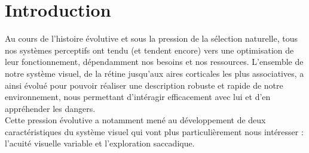 
\chapter{Introduction} %
\label{Introduction} %


\newcommand{\keyword}[1]{\textbf{#1}}
\newcommand{\tabhead}[1]{\textbf{#1}}
\newcommand{\code}[1]{\texttt{#1}}
\newcommand{\file}[1]{\texttt{\bfseries#1}}
\newcommand{\option}[1]{\texttt{\itshape#1}}


Au cours de l'histoire évolutive et sous la pression de la sélection naturelle, tous nos systèmes perceptifs ont tendu (et tendent encore) vers une optimisation de leur fonctionnement, dépendamment nos besoins et nos ressources.
L'ensemble de notre système visuel, de la rétine jusqu'aux aires corticales les plus associatives, a ainsi évolué pour pouvoir réaliser une description robuste et rapide de notre environnement, nous permettant d'intéragir efficacement avec lui et d'en appréhender les dangers. \autocite{Werner2014}\\
Cette pression évolutive a notamment mené au développement de deux caractéristiques du système visuel qui vont plus particulièrement nous intéresser : l'acuité visuelle variable et l'exploration saccadique. \autocite{Werner2014} \\

